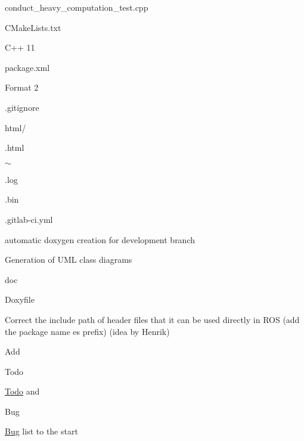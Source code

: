 \begin{DoxyEnumerate}
\begin{DoxyEnumerate}
\begin{DoxyEnumerate}
\begin{DoxyEnumerate}
\begin{DoxyEnumerate}
\item conduct\+\_\+heavy\+\_\+computation\+\_\+test.\+cpp
\end{DoxyEnumerate}
\end{DoxyEnumerate}
\end{DoxyEnumerate}
\begin{DoxyEnumerate}
\item C\+Make\+Lists.\+txt
\begin{DoxyItemize}
\item C++ 11
\end{DoxyItemize}
\end{DoxyEnumerate}
\begin{DoxyEnumerate}
\item package.\+xml
\begin{DoxyItemize}
\item Format 2
\end{DoxyItemize}
\end{DoxyEnumerate}
\end{DoxyEnumerate}
\begin{DoxyEnumerate}
\item .gitignore
\begin{DoxyItemize}
\item html/
\item .html
\item $\sim$
\item .log
\item .bin
\end{DoxyItemize}
\end{DoxyEnumerate}
\begin{DoxyEnumerate}
\item .gitlab-\/ci.\+yml
\begin{DoxyItemize}
\item automatic doxygen creation for development branch
\item Generation of U\+ML class diagrams
\end{DoxyItemize}
\end{DoxyEnumerate}
\begin{DoxyEnumerate}
\item doc
\begin{DoxyEnumerate}
\item Doxyfile
\begin{DoxyItemize}
\item Correct the include path of header files that it can be used directly in R\+OS (add the package name es prefix) (idea by Henrik)
\item Add\begin{DoxyRefDesc}{Todo}
\item[\hyperlink{todo__todo000001}{Todo}]and\end{DoxyRefDesc}
\begin{DoxyRefDesc}{Bug}
\item[\hyperlink{bug__bug000001}{Bug}]list to the start\end{DoxyRefDesc}


\end{DoxyItemize}
\end{DoxyEnumerate}
\end{DoxyEnumerate}
\end{DoxyEnumerate}
